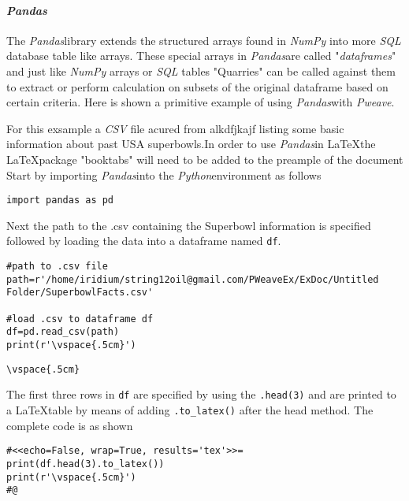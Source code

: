 \documentclass[a4paper,11pt,final]{article}
\newcommand{\pweave}{\emph{Pweave}\space}
\newcommand{\python}{\emph{Python}\space}
\newcommand{\latex}{\LaTeX\space}
\newcommand{\pandas}{\emph{Pandas}\space}
\begin{document}
        \paragraph{\pandas}
        The \pandas library extends the structured arrays found in \emph{NumPy} into more \emph{SQL} database table like arrays. These special arrays in \pandas are called "\emph{dataframes}" and just like \emph{NumPy} arrays or \emph{SQL} tables "Quarries" can be called against them to extract or perform calculation on subsets of the original dataframe based on certain criteria. Here is shown a primitive example of using \pandas with \pweave.

        For this exsample a \emph{CSV} file acured from alkdfjkajf listing some basic information about past USA superbowls.In order to use \pandas in \latex the \latex package "booktabs" will need to be added to the preample of the document
           Start by importing \pandas into the \python environment as follows

\begin{verbatim}
import pandas as pd
\end{verbatim}

           Next the path to the .csv containing the Superbowl information is specified followed by loading the data into a dataframe named \texttt{df}.


\begin{verbatim}
#path to .csv file
path=r'/home/iridium/string12oil@gmail.com/PWeaveEx/ExDoc/Untitled
Folder/SuperbowlFacts.csv'

#load .csv to dataframe df
df=pd.read_csv(path)
print(r'\vspace{.5cm}')
\end{verbatim}
\begin{verbatim}
\vspace{.5cm}

\end{verbatim}


          The first three rows in \texttt{df} are specified by using the \texttt{.head(3)} and are printed to a \latex table by means of adding \texttt{.to\_latex()} after the head method. The complete code is as shown
\begin{verbatim}
#<<echo=False, wrap=True, results='tex'>>=
print(df.head(3).to_latex())
print(r'\vspace{.5cm}')
#@
\end{verbatim}
\end{document}
